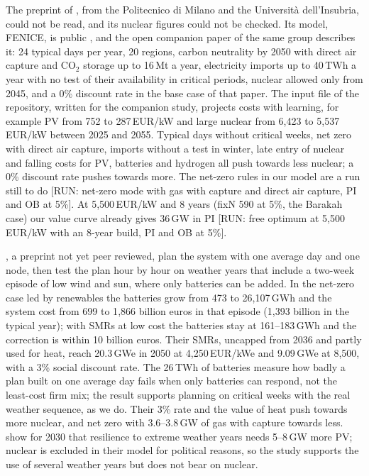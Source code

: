 The preprint of \citet{CataniaSSRN}, from the Politecnico di Milano and the Università dell'Insubria, could not be read, and its nuclear figures could not be checked. Its model, FENICE, is public \citep{FENICE}, and the open companion paper of the same group \citep{Catania2026} describes it: 24 typical days per year, 20 regions, carbon neutrality by 2050 with direct air capture and CO$_2$ storage up to 16\,Mt a year, electricity imports up to 40\,TWh a year with no test of their availability in critical periods, nuclear allowed only from 2045, and a 0\% discount rate in the base case of that paper. The input file of the repository, written for the companion study, projects costs with learning, for example PV from 752 to 287\,EUR/kW and large nuclear from 6{,}423 to 5{,}537\,EUR/kW between 2025 and 2055. Typical days without critical weeks, net zero with direct air capture, imports without a test in winter, late entry of nuclear and falling costs for PV, batteries and hydrogen all push towards less nuclear; a 0\% discount rate pushes towards more. The net-zero rules in our model are a run still to do [RUN: net-zero mode with gas with capture and direct air capture, PI and OB at 5\%]. At 5{,}500\,EUR/kW and 8 years (fixN 590 at 5\%, the Barakah case) our value curve already gives 36\,GW in PI [RUN: free optimum at 5{,}500\,EUR/kW with an 8-year build, PI and OB at 5\%].

\citet{Stevanato2026}, a preprint not yet peer reviewed, plan the system with one average day and one node, then test the plan hour by hour on weather years that include a two-week episode of low wind and sun, where only batteries can be added. In the net-zero case led by renewables the batteries grow from 473 to 26{,}107\,GWh and the system cost from 699 to 1{,}866 billion euros in that episode (1{,}393 billion in the typical year); with SMRs at low cost the batteries stay at 161--183\,GWh and the correction is within 10 billion euros. Their SMRs, uncapped from 2036 and partly used for heat, reach 20.3\,GWe in 2050 at 4{,}250\,EUR/kWe and 9.09\,GWe at 8{,}500, with a 3\% social discount rate. The 26\,TWh of batteries measure how badly a plan built on one average day fails when only batteries can respond, not the least-cost firm mix; the result supports planning on critical weeks with the real weather sequence, as we do. Their 3\% rate and the value of heat push towards more nuclear, and net zero with 3.6--3.8\,GW of gas with capture towards less. \citet{DiBella2025} show for 2030 that resilience to extreme weather years needs 5--8\,GW more PV; nuclear is excluded in their model for political reasons, so the study supports the use of several weather years but does not bear on nuclear.

